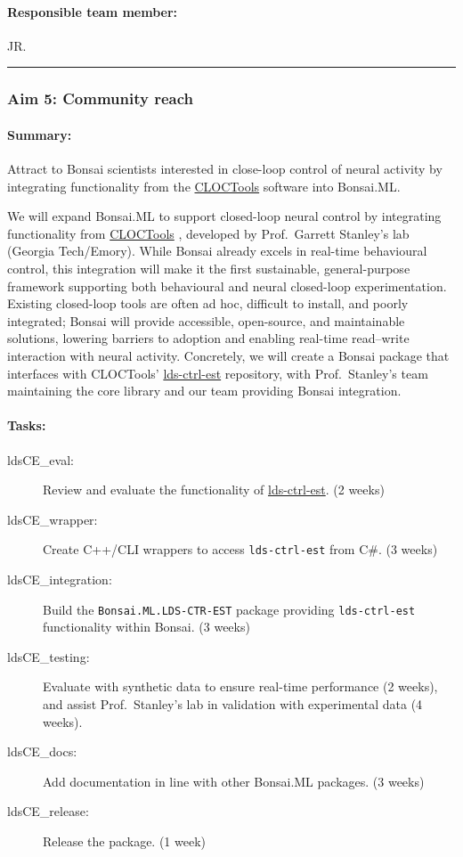 \paragraph{Responsible team member:} JR.

\noindent\rule{\textwidth}{1pt}
\subsubsection{Aim 5: Community reach}

\paragraph{Summary:} Attract to Bonsai scientists interested in close-loop
control of neural activity by integrating functionality from
the \href{https://cloctools.github.io/}{CLOCTools} software into Bonsai.ML.

We will expand Bonsai.ML to support closed-loop neural control by integrating
functionality from \href{https://cloctools.github.io/}{CLOCTools}
, developed by Prof.~Garrett Stanley’s lab (Georgia Tech/Emory). While Bonsai
already excels in real-time behavioural control, this integration will make it
the first sustainable, general-purpose framework supporting both behavioural
and neural closed-loop experimentation. Existing closed-loop tools are often ad
hoc, difficult to install, and poorly integrated; Bonsai will provide
accessible, open-source, and maintainable solutions, lowering barriers to
adoption and enabling real-time read–write interaction with neural activity.
Concretely, we will create a Bonsai package that interfaces with CLOCTools’
\href{https://github.com/CLOCTools/lds-ctrl-est}{lds-ctrl-est}
 repository, with Prof.~Stanley’s team maintaining the core library and our
 team providing Bonsai integration.

\paragraph{Tasks:}  

\begin{description}
    \item[ldsCE\_eval:] Review and evaluate the functionality of \href{https://github.com/CLOCTools/lds-ctrl-est}{lds-ctrl-est}. (2 weeks)  
    \item[ldsCE\_wrapper:] Create C++/CLI wrappers to access \texttt{lds-ctrl-est} from C\#. (3 weeks)  
    \item[ldsCE\_integration:] Build the \texttt{Bonsai.ML.LDS-CTR-EST} package providing \texttt{lds-ctrl-est} functionality within Bonsai. (3 weeks)  
    \item[ldsCE\_testing:] Evaluate with synthetic data to ensure real-time performance (2 weeks), and assist Prof.~Stanley’s lab in validation with experimental data (4 weeks).  
    \item[ldsCE\_docs:] Add documentation in line with other Bonsai.ML packages. (3 weeks)  
    \item[ldsCE\_release:] Release the package. (1 week)  
\end{description}  

